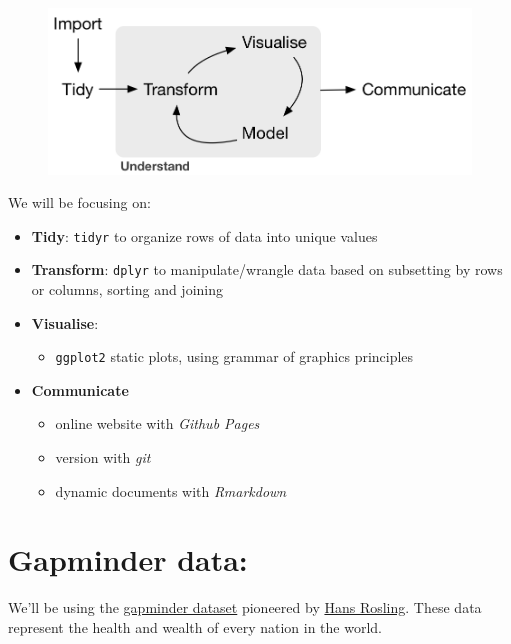 \documentclass[]{book}
\providecommand{\tightlist}{%
  \setlength{\itemsep}{0pt}\setlength{\parskip}{0pt}}
\theoremstyle{definition}
\theoremstyle{definition}
\theoremstyle{definition}
\theoremstyle{remark}
\begin{document}
\begin{figure}[htbp]
\centering
\includegraphics{img/r4ds_data-science.png}
\caption{}
\end{figure}

We will be focusing on:

\begin{itemize}
\tightlist
\item
  \textbf{Tidy}: \texttt{tidyr} to organize rows of data into unique
  values
\item
  \textbf{Transform}: \texttt{dplyr} to manipulate/wrangle data based on
  subsetting by rows or columns, sorting and joining
\item
  \textbf{Visualise}:

  \begin{itemize}
  \tightlist
  \item
    \texttt{ggplot2} static plots, using grammar of graphics principles
  \end{itemize}
\item
  \textbf{Communicate}

  \begin{itemize}
  \tightlist
  \item
    online website with \emph{Github Pages}
  \item
    version with \emph{git}
  \item
    dynamic documents with \emph{Rmarkdown}
  \end{itemize}
\end{itemize}

\section{Gapminder data:}\label{gapminder-data}

We'll be using the \href{http://www.gapminder.org/world}{gapminder
dataset} pioneered by
\href{https://www.ted.com/speakers/hans_rosling}{Hans Rosling}. These
data represent the health and wealth of every nation in the world.
\end{document}
